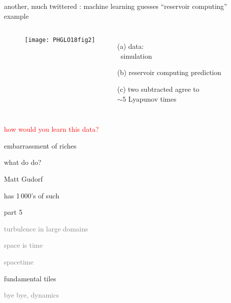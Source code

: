 \begin{frame}{another, much twittered : machine learning guesses}
``reservoir computing'' example

\bigskip

 \begin{columns}
~~~~~~\texttt{[image: PHGLO18fig2]}
 \begin{itemize}
 \item[(a)] data: \\ \KS\ simulation
 \item[(b)] reservoir computing prediction
 \item[(c)] two subtracted agree to \\
            $\sim 5$ Lyapunov times
 \end{itemize}
 \end{columns}
\vfill\hfill\textcolor{red}{\huge how would you learn this data?}
\end{frame}

\begin{frame}{embarrassment of riches}
\begin{center}
{\huge what do do?}
\end{center}

\vfill

{\Large Matt Gudorf}

\medskip

\hfill has 1\,000's of such \twots
\end{frame}


\begin{frame}{part 5}
\begin{enumerate}
              \item
    \textcolor{gray}{\small
turbulence in large domains
              \item
space is time
              \item
spacetime
    }
              \item {\Large
fundamental tiles
    }\textcolor{gray}{\small
              \item
bye bye, dynamics
                    }
            \end{enumerate}
\end{frame}


